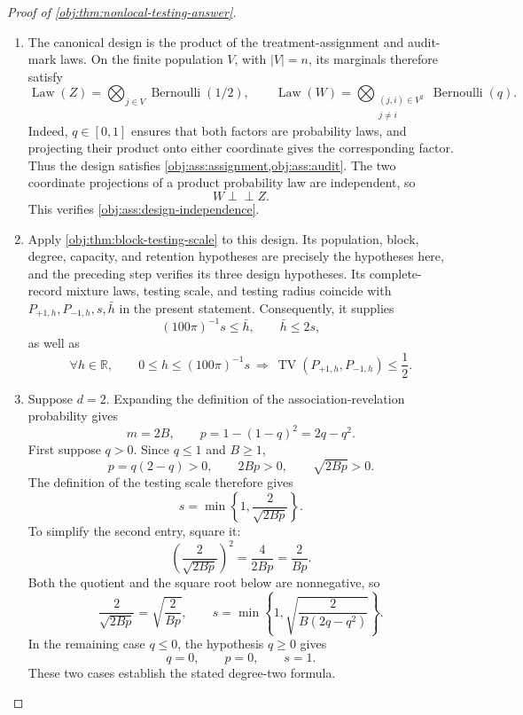 \begin{proof}[Proof of \cref{obj:thm:nonlocal-testing-answer}]
\begin{enumerate}
\item The canonical design is the product of the treatment-assignment and audit-mark laws. On the finite population \(V\), with \(|V|=n\), its marginals therefore satisfy
\[
\operatorname{Law}(Z)
=\bigotimes_{j\in V}\operatorname{Bernoulli}(1/2),
\qquad
\operatorname{Law}(W)
=\bigotimes_{\substack{(j,i)\in V^2\\j\ne i}}
\operatorname{Bernoulli}(q).
\]
Indeed, \(q\in[0,1]\) ensures that both factors are probability laws, and projecting their product onto either coordinate gives the corresponding factor. Thus the design satisfies \cref{obj:ass:assignment,obj:ass:audit}.
The two coordinate projections of a product probability law are independent, so
\[
W\mathbin{\perp\!\!\!\perp}Z.
\]
This verifies \cref{obj:ass:design-independence}.

\item Apply \cref{obj:thm:block-testing-scale} to this design. Its population, block, degree, capacity, and retention hypotheses are precisely the hypotheses here, and the preceding step verifies its three design hypotheses. Its complete-record mixture laws, testing scale, and testing radius coincide with \(P_{+1,h},P_{-1,h},s,\bar h\) in the present statement. Consequently, it supplies
\[
(100\pi)^{-1}s\le\bar h,
\qquad
\bar h\le2s,
\]
as well as
\[
\forall h\in\mathbb R,\qquad
0\le h\le(100\pi)^{-1}s
\ \Longrightarrow\
\operatorname{TV}(P_{+1,h},P_{-1,h})\le\frac12.
\]

\item Suppose \(d=2\). Expanding the definition of the association-revelation probability gives
\[
m=2B,
\qquad
p=1-(1-q)^2=2q-q^2.
\]
First suppose \(q>0\). Since \(q\le1\) and \(B\ge1\),
\[
p=q(2-q)>0,
\qquad
2Bp>0,
\qquad
\sqrt{2Bp}>0.
\]
The definition of the testing scale therefore gives
\[
s=\min\left\{1,\frac{2}{\sqrt{2Bp}}\right\}.
\]
To simplify the second entry, square it:
\[
\left(\frac{2}{\sqrt{2Bp}}\right)^2
=\frac{4}{2Bp}
=\frac{2}{Bp}.
\]
Both the quotient and the square root below are nonnegative, so
\[
\frac{2}{\sqrt{2Bp}}
=\sqrt{\frac{2}{Bp}},
\qquad
s=\min\left\{1,\sqrt{\frac{2}{B(2q-q^2)}}\right\}.
\]
In the remaining case \(q\le0\), the hypothesis \(q\ge0\) gives
\[
q=0,\qquad p=0,\qquad s=1.
\]
These two cases establish the stated degree-two formula.
\end{enumerate}
\end{proof}

